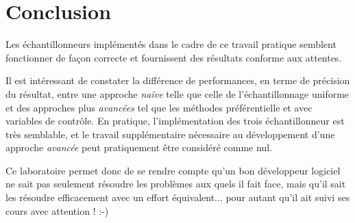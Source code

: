 \documentclass[a4paper,11pt]{article}
\begin{document}
\section{Conclusion}

Les échantillonneurs implémentés dans le cadre de ce travail pratique semblent fonctionner de façon correcte et fournissent des résultats conforme aux attentes. 

Il est intéressant de constater la différence de performances, en terme de précision du résultat, entre une approche \emph{naïve} telle que celle de l'échantillonnage uniforme et des approches plus \emph{avancées} tel que les méthodes préférentielle et avec variables de contrôle. En pratique, l'implémentation des trois échantillonneur est très semblable, et le travail supplémentaire nécessaire au développement d'une approche \emph{avancée} peut pratiquement être considéré comme nul.

Ce laboratoire permet donc de se rendre compte qu'un bon développeur logiciel ne sait pas seulement résoudre les problèmes aux quels il fait face, mais qu'il sait les résoudre efficacement avec un effort équivalent... pour autant qu'il ait suivi ses cours avec attention ! :-)
\end{document}
